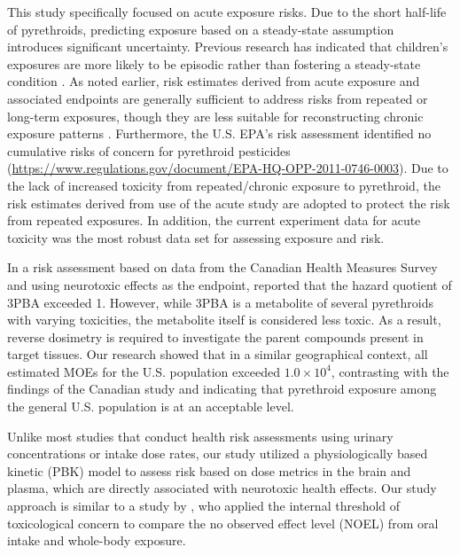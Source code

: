 \documentclass[toxics,article,submit,pdftex,moreauthors]{Definitions/mdpi}
\begin{document}
This study specifically focused on acute exposure risks. Due to the short
half-life of pyrethroids, predicting exposure based on a steady-state
assumption introduces significant uncertainty. Previous research has indicated
that children's exposures are more likely to be episodic rather than fostering
a steady-state condition \citep{kissel_comparison_2005}. As noted earlier, risk
estimates derived from acute exposure and associated endpoints are generally
sufficient to address risks from repeated or long-term exposures, though they
are less suitable for reconstructing chronic exposure patterns
\citep{hays2007biomonitoring, aylward_interpreting_2012}. Furthermore, the U.S.
EPA's risk assessment identified no cumulative risks of concern for pyrethroid
pesticides
(\url{https://www.regulations.gov/document/EPA-HQ-OPP-2011-0746-0003}). Due to
the lack of increased toxicity from repeated/chronic exposure to pyrethroid,
the risk estimates derived from use of the acute study are adopted to protect
the risk from repeated exposures. In addition, the current experiment data for
acute toxicity was the most robust data set for assessing exposure and risk.

In a risk assessment based on data from the Canadian Health Measures
Survey and using neurotoxic effects as the endpoint,
\citet{faure_evaluation_2020} reported that the hazard quotient of 3PBA
exceeded 1. However, while 3PBA is a metabolite of several pyrethroids
with varying toxicities, the metabolite itself is considered less toxic.
As a result, reverse dosimetry is required to investigate the parent
compounds present in target tissues. Our research showed that in a
similar geographical context, all estimated MOEs for the U.S. population
exceeded \(1.0 \times 10^{4}\), contrasting with the findings of the
Canadian study and indicating that pyrethroid exposure among the general
U.S. population is at an acceptable level.

Unlike most studies that conduct health risk assessments using urinary
concentrations or intake dose rates, our study utilized a
physiologically based kinetic (PBK) model to assess risk based on dose
metrics in the brain and plasma, which are directly associated with
neurotoxic health effects. Our study approach is similar to a study by
\citet{arnot_developing_2022}, who applied the internal threshold of
toxicological concern to compare the no observed effect level (NOEL)
from oral intake and whole-body exposure.
\end{document}
